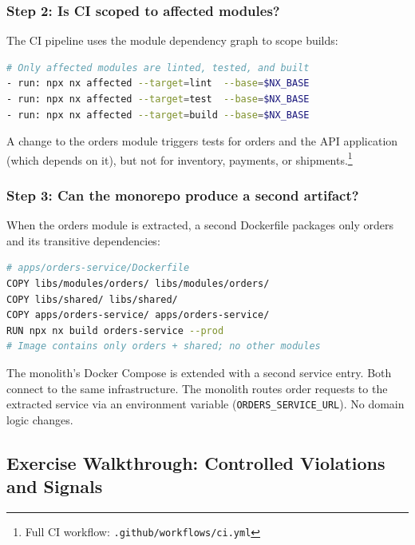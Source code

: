\subsubsection*{Step 2: Is CI scoped to affected modules?}

The CI pipeline uses the module dependency graph to scope builds:

\begin{lstlisting}[basicstyle=\ttfamily\scriptsize,language=bash,caption={Module-aware CI with affected scope},label={lst:g5-ci-affected}]
# Only affected modules are linted, tested, and built
- run: npx nx affected --target=lint  --base=$NX_BASE
- run: npx nx affected --target=test  --base=$NX_BASE
- run: npx nx affected --target=build --base=$NX_BASE
\end{lstlisting}

\noindent
A change to the orders module triggers tests for orders and the API application (which depends on it), but not for inventory, payments, or shipments.\footnote{Full CI workflow: \texttt{.github/workflows/ci.yml}}

\subsubsection*{Step 3: Can the monorepo produce a second artifact?}

When the orders module is extracted, a second Dockerfile packages only orders and its transitive dependencies:

\begin{lstlisting}[basicstyle=\ttfamily\scriptsize,language=bash,caption={Extracted service Dockerfile (abbreviated)},label={lst:g5-dockerfile-d2}]
# apps/orders-service/Dockerfile
COPY libs/modules/orders/ libs/modules/orders/
COPY libs/shared/ libs/shared/
COPY apps/orders-service/ apps/orders-service/
RUN npx nx build orders-service --prod
# Image contains only orders + shared; no other modules
\end{lstlisting}

\noindent
The monolith's Docker Compose is extended with a second service entry. Both connect to the same infrastructure. The monolith routes order requests to the extracted service via an environment variable (\texttt{ORDERS\_SERVICE\_URL}). No domain logic changes.

\subsection*{Exercise Walkthrough: Controlled Violations and Signals}

